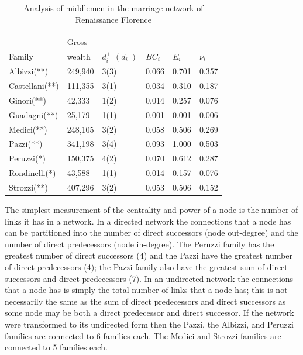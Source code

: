 \documentclass[11pt,fleqn]{article}
\begin{document}
\begin{table}
\begin{center}
\begin{tabu} to \textwidth {X[l]  X[c]  X[c]  X[c]  X[c]  X[c]}
\\[-1.8ex]\hline
\hline \\[-1.8ex]
	            & Gross   &								 &			 &		   &		  \\
Family 		    & wealth  & $d^+_i$ $\left(d^-_i\right)$ & $BC_i$    & $E_i$   & $\nu_i$  \\ \hline
Albizzi(**)     & 249,940 & 3(3) 						 & 0.066 	 & 0.701   & 0.357 	  \\
Castellani(**)  & 111,355 & 3(1) 						 & 0.034 	 & 0.310   & 0.187 	  \\
Ginori(**)      & 42,333  & 1(2) 						 & 0.014 	 & 0.257   & 0.076    \\
Guadagni(**)    & 25,179  & 1(1) 						 & 0.001 	 & 0.001   & 0.006 	  \\
Medici(**)      & 248,105 & 3(2) 						 & 0.058 	 & 0.506   & 0.269 	  \\
Pazzi(**)       & 341,198 & 3(4) 						 & 0.093 	 & 1.000   & 0.503    \\
Peruzzi(*)      & 150,375 & 4(2) 						 & 0.070 	 & 0.612   & 0.287    \\
Rondinelli(*)   & 43,588  & 1(1) 						 & 0.014 	 & 0.157   & 0.076    \\
Strozzi(**)     & 407,296 & 3(2) 						 & 0.053 	 & 0.506   & 0.152    \\ \hline
\end{tabu}%
\caption{Analysis of middlemen in the marriage network of Renaissance Florence}
\label{tabFlorence}
\end{center}
\end{table}

The simplest measurement of the centrality and power of a node is the number of links it has in a network. In a directed network the connections that a node has can be partitioned into the number of direct successors (node out-degree) and the number of direct predecessors (node in-degree). The Peruzzi family has the greatest number of direct successors (4) and the Pazzi have the greatest number of direct predecessors (4); the Pazzi family also have the greatest sum of direct successors and direct predecessors (7). In an undirected network the connections that a node has is simply the total number of links that a node has; this is not necessarily the same as the sum of direct predecessors and direct successors as some node may be both a direct predecessor and direct successor. If the network were transformed to its undirected form then the Pazzi, the Albizzi, and Peruzzi families are connected to 6 families each. The Medici and Strozzi families are connected to 5 families each. 
\end{document}
